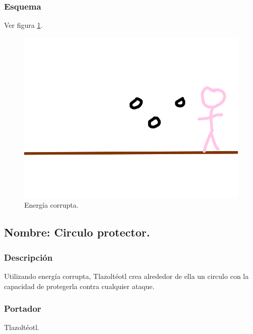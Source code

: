 \documentclass[11pt,letterpaper]{article}
\begin{document}
\subsubsection{Esquema}
			Ver figura \ref{fig:energiaC}.
			\begin{figure}
				\centering
				\includegraphics[height=0.2 \textheight]{Imagenes/energiaC}
				\caption{Energía corrupta.}
				\label{fig:energiaC}
			\end{figure}	
\subsection{Nombre: Circulo protector.}
\subsubsection{Descripción}
Utilizando energía corrupta,  Tlazoltéotl crea alrededor de ella un circulo con la capacidad de protegerla contra cualquier ataque.
\subsubsection{Portador}
Tlazoltéotl.
\end{document}
